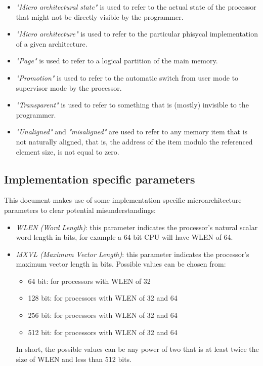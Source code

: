\documentclass{article}
\begin{document}
\begin{itemize}
            \item \textit{"Micro architectural state"} is used to refer to the actual state of the processor that might not be directly visible by the programmer.
            \item \textit{"Micro architecture"} is used to refer to the particular phisycal implementation of a given architecture.
            \item \textit{"Page"} is used to refer to a logical partition of the main memory.
            \item \textit{"Promotion"} is used to refer to the automatic switch from user mode to supervisor mode by the processor.
            \item \textit{"Transparent"} is used to refer to something that is (mostly) invisible to the programmer.
            \item \textit{"Unaligned"} and \textit{"misaligned"} are used to refer to any memory item that is not naturally aligned, that is, the address of the item modulo the referenced element size, is not equal to zero.

        \end{itemize}

    \subsection[Implementation specific parameters]{Implementation specific parameters}

        This document makes use of some implementation specific microarchitecture parameters to clear potential misunderstandings:

        \begin{itemize}

            \item \textit{WLEN (Word Length)}: this parameter indicates the processor's natural scalar word length in bits, for example a 64 bit CPU will have WLEN of 64.
            \item \textit{MXVL (Maximum Vector Length)}: this parameter indicates the processor's maximum vector length in bits. Possible values can be chosen from:

                \begin{itemize}

                    \item 64 bit: for processors with WLEN of 32
                    \item 128 bit: for processors with WLEN of 32 and 64
                    \item 256 bit: for processors with WLEN of 32 and 64
                    \item 512 bit: for processors with WLEN of 32 and 64

                \end{itemize}

                In short, the possible values can be any power of two that is at least twice the size of WLEN and less than 512 bits.

        \end{itemize}
\end{document}
